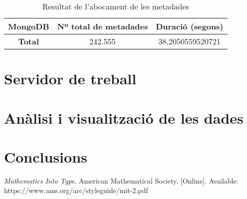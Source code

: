 \documentclass[lettersize,journal]{IEEEtran}
\begin{document}
\begin{table}[!t]
    \caption{Resultat de l'abocament de les metadades\label{tab:table2}}
    \centering
    \begin{tabular}{|c|c|c|}
        \hline
        MongoDB & Nº total de metadades & Duració (segons)\\
        \hline
        \textbf{Total} & 242.555 & 38,2050559520721\\
        \hline
    \end{tabular}
\end{table}

\section{Servidor de treball}\label{sec:server-ostia}
\lipsum[1]

\section{Anàlisi i visualització de les dades}\label{sec:data-visualization}
\lipsum[1]

\section{Conclusions}\label{sec:conclusions}
\lipsum[1]

\begin{thebibliography}{1}


    {\textit{Mathematics Into Type}}. American Mathematical Society. [Online]. Available: https://www.ams.org/arc/styleguide/mit-2.pdf
\end{thebibliography}
\end{document}
